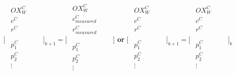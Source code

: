 \begin{center}$\lbrack \begin{matrix}
\begin{matrix}
OX_{W}^{C} & \\
c^{C} & \\
r^{C} & \\
\end{matrix}
 & \\
\begin{matrix}
p_{1}^{C} & \\
p_{2}^{C} & \\
\vdots & \\
\end{matrix}
 & \\
\end{matrix}
\rbrack _{k+1}=\lbrack \begin{matrix}
\begin{matrix}
OX_{W}^{C} & \\
c_{measured}^{C} & \\
r_{measured}^{C} & \\
\end{matrix}
 & \\
\begin{matrix}
p_{1}^{C} & \\
p_{2}^{C} & \\
\vdots & \\
\end{matrix}
 & \\
\end{matrix}
\rbrack $\textbf{ or }$ \lbrack \begin{matrix}
\begin{matrix}
OX_{W}^{C} & \\
c^{C} & \\
r^{C} & \\
\end{matrix}
 & \\
\begin{matrix}
p_{1}^{C} & \\
p_{2}^{C} & \\
\vdots & \\
\end{matrix}
 & \\
\end{matrix}
\rbrack _{k+1}=\lbrack \begin{matrix}
\begin{matrix}
OX_{W}^{C} & \\
c^{C} & \\
r^{C} & \\
\end{matrix}
 & \\
\begin{matrix}
p_{1}^{C} & \\
p_{2}^{C} & \\
\vdots & \\
\end{matrix}
 & \\
\end{matrix}
\rbrack _{k}$\end{center}

